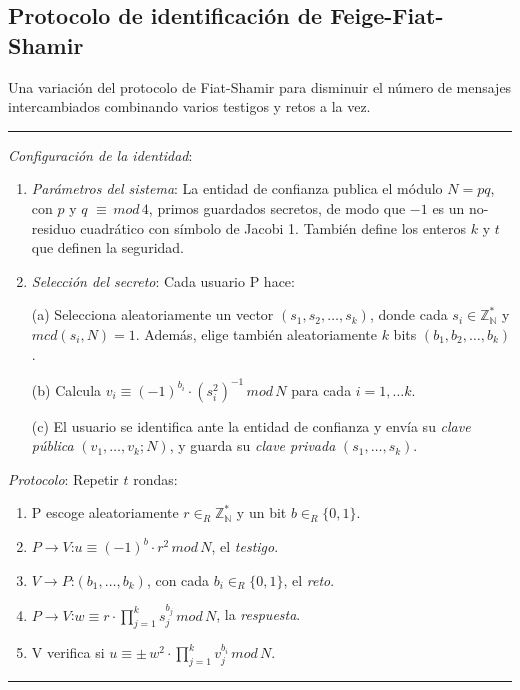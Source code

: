 \subsection{Protocolo de identificación de Feige-Fiat-Shamir}


Una variación del protocolo de Fiat-Shamir para disminuir el número de mensajes intercambiados combinando varios testigos y retos a la vez.

\rule{\textwidth}{1pt}
\begin{algorithm}
	\hfil
	
	\textit{Configuración de la identidad}:
	\begin{enumerate}
		\item \textit{Parámetros del sistema}: La entidad de confianza publica el módulo $N=pq$, con $p$ y $q$ $\equiv \, mod \, 4$, primos guardados secretos, de modo que $-1$ es un no-residuo cuadrático con símbolo de Jacobi 1. También define los enteros $k$ y $t$ que definen la seguridad.
		
		\item \textit{Selección del secreto}: Cada usuario P hace:
		
		\subitem (a) Selecciona aleatoriamente un vector $(s_1,s_2,\dots ,s_k)$, donde cada  $s_i \in \mathbb{Z_N^*}$ y $mcd(s_i, N)=1$. Además, elige también aleatoriamente $k$ bits $(b_1, b_2, \dots , b_k)$.
		
		\subitem (b) Calcula $v_i \equiv (-1)^{b_i}\cdot (s_i^2)^{-1} \, mod \, N$ para cada $i=1,\dots k$.
		
		\subitem (c) El usuario se identifica ante la entidad de confianza y envía su \textit{clave pública} $(v_1,\dots , v_k; N)$, y guarda su \textit{clave privada} $(s_1, \dots , s_k)$.
		
	\end{enumerate}
	
	
	\textit{Protocolo}: Repetir $t$ rondas:
	\begin{enumerate}
		\item P escoge aleatoriamente $r \in_R \mathbb{Z_N^*}$ y un bit $b \in_R \{0,1\}$.
		\item $P \rightarrow V$:\quad $u \equiv (-1)^b \cdot r^2 \, mod \, N$, el \textit{testigo}.
		\item $V \rightarrow P$:\quad $(b_1,\dots ,b_k)$, con cada $b_i \in_R \{0,1\}$, el \textit{reto}.
		\item $P \rightarrow V$:\quad $w \equiv r\cdot \prod_{j=1}^{k} s_j^{b_j} \, mod \, N$, la \textit{respuesta}.
		\item V verifica si \quad $ u \equiv \pm \, w^2 \cdot \prod_{j=1}^{k} v_j^{b_i} \, mod \, N$.
	\end{enumerate}
	
\end{algorithm}
\rule{\textwidth}{1pt}

